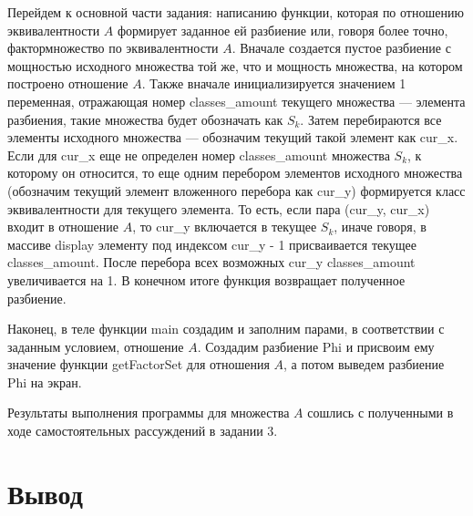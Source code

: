 \documentclass[12pt]{article}
\begin{document}
	Перейдем к основной части задания: написанию функции, которая по отношению эквивалентности $A$ формирует заданное ей разбиение или, говоря более точно, фактормножество по эквивалентности $A$. Вначале создается пустое разбиение с мощностью исходного множества той же, что и мощность множества, на котором построено отношение $A$. Также вначале инициализируется значением 1 переменная, отражающая номер classes\_amount текущего множества --- элемента разбиения, такие множества будет обозначать как $S_k$. Затем перебираются все элементы исходного множества --- обозначим текущий такой элемент как cur\_x. Если для cur\_x еще не определен номер classes\_amount множества $S_k$, к которому он относится, то еще одним перебором элементов исходного множества (обозначим текущий элемент вложенного перебора как cur\_y) формируется класс эквивалентности для текущего элемента. То есть, если пара (cur\_y, cur\_x) входит в отношение $A$, то cur\_y включается в текущее $S_k$, иначе говоря, в массиве display элементу под индексом cur\_y - 1 присваивается текущее classes\_amount. После перебора всех возможных cur\_y classes\_amount увеличивается на 1. В конечном итоге функция возвращает полученное разбиение.
		
	 
	
	Наконец, в теле функции main создадим и заполним парами, в соответствии с заданным условием, отношение $A$. Создадим разбиение Phi и присвоим ему значение функции getFactorSet для отношения $A$, а потом выведем разбиение Phi на экран.
	
	 
	
	\begin{figure}[h]
		\noindent{}
	\end{figure}
	
	Результаты выполнения программы для множества $A$ сошлись с полученными в ходе самостоятельных рассуждений в задании 3.
	
	
	\section{Вывод}
	\label{final}
	
\end{document}
